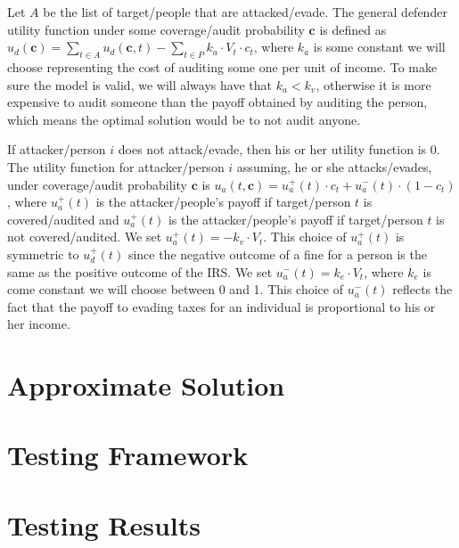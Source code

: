 \documentclass[paper=letter, fontsize=11pt]{article}
\begin{document}
Let $A$ be the list of target/people that are attacked/evade. The
general defender utility function under some coverage/audit
probability $\bm{c}$ is defined as
$u_d(\bm{c}) = \sum_{t \in A} u_d(\bm{c}, t) - \sum_{t \in P} k_a
\cdot V_t \cdot c_t$, where $k_a$ is some constant we will choose
representing the cost of auditing some one per unit of income. To make
sure the model is valid, we will always have that $k_a < k_v$,
otherwise it is more expensive to audit someone than the payoff
obtained by auditing the person, which means the optimal solution
would be to not audit anyone.

If attacker/person $i$ does not attack/evade, then his or her utility
function is 0. The utility function for attacker/person $i$ assuming,
he or she attacks/evades, under coverage/audit probability $\bm{c}$ is
$u_a(t, \bm{c}) = u_a^+(t) \cdot c_t + u_a^-(t) \cdot (1 - c_t)$,
where $u_a^+(t)$ is the attacker/people's payoff if target/person $t$
is covered/audited and $u_a^+(t)$ is the attacker/people's payoff if
target/person $t$ is not covered/audited. We set
$u_a^+(t) = -k_v \cdot V_t$. This choice of $u_a^+(t)$ is symmetric to
$u_d^+(t)$ since the negative outcome of a fine for a person is the
same as the positive outcome of the IRS. We set
$u_a^-(t) = k_e \cdot V_t$, where $k_e$ is come constant we will
choose between 0 and 1. This choice of $u_a^-(t)$ reflects the fact
that the payoff to evading taxes for an individual is proportional to
his or her income.

\section*{Approximate Solution}

\cite{conitzer2006computing}

\section*{Testing Framework}

\section*{Testing Results}



\end{document}
